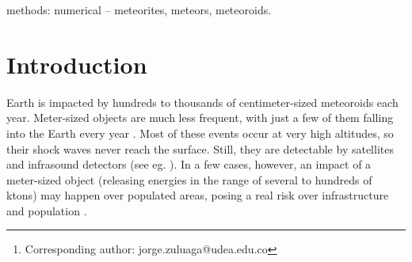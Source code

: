 \documentclass[fleqn,usenatbib]{mnras}
\title[Can we predict Impact conditions]{\mytitle}
\author[Zuluaga et.al]{
Jorge I. Zuluaga$^{1}$\thanks{Corresponding author: jorge.zuluaga@udea.edu.co},
Pablo A. Cuartas-Restrepo$^{1}$,
Jhonatan Ospina$^{2}$ and
Mario Sucerquia$^{1}$
\\
$^{1}$Solar, Earth and Planetary Physics Group - SEAP,  Institute of Physics, University of Antioquia, calle 70 No. 52 - 21, Medell\'in (Colombia)
\\
$^{2}$Sociedad Antioque\~na de Astronom\'ia / CAMO group, Medell\'in (Colombia)
}
\date{Accepted XXX. Received YYY; in original form ZZZ}
\renewcommand{\check}[1]{\textcolor{red}{#1}}
\begin{document}
\label{firstpage}
\pagerange{\pageref{firstpage}--\pageref{lastpage}}
\maketitle

\begin{abstract}
A few meter-sized meteoroids impact the atmosphere of the Earth per year. Most (if not all) of them are undetectable before the impact and hence, predicting where and how they will fall, seems to be impossible. In this letter we show compelling evidence that we can constrain, in advance, the dynamical and geometrical conditions of an impact. For this purpose, we analyze the well-documented case of the Chelyabinsk impact and the more recent and smaller Cuba event, whose conditions we additionally estimate and provide here. After applying the {\em Gravitational Ray Tracing} algorithm (GRT) to theoretically ``predict'' the impact conditions of the aforementioned events, we find that the speed, incoming direction and (marginally) the orbital elements, can be constrained in advance, starting only on one hand, with the geographical location and time of the impact, and on the other hand, with the distribution in configuration space of Near Earth Objects (NEOs). Any improvement in our capability to predict or at least to constrain impact properties of medium-sized and large meteoroids, will help us to be better prepared for its potentially damaging effects.
\end{abstract}

\begin{keywords}
methods: numerical -- meteorites, meteors, meteoroids.
\end{keywords}

\section{Introduction}
\label{sec:introduction}

Earth is impacted by hundreds to thousands of centimeter-sized meteoroids each year. Meter-sized objects are much less frequent, with just a few of them falling into the Earth every year \citep{Brown2013}.  Most of these events occur at very high altitudes, so their shock waves never reach the surface. Still, they are  detectable by satellites \citep{Chapman1994, Brown2002} and infrasound detectors (see eg. \citep{Silber2011}).  
In a few cases, however, an impact of a meter-sized object (releasing energies in the range of several to hundreds of ktons) may happen over populated areas, posing a real risk over infrastructure and population \citep{Popova2013, Rumpf2015}. 
\end{document}
